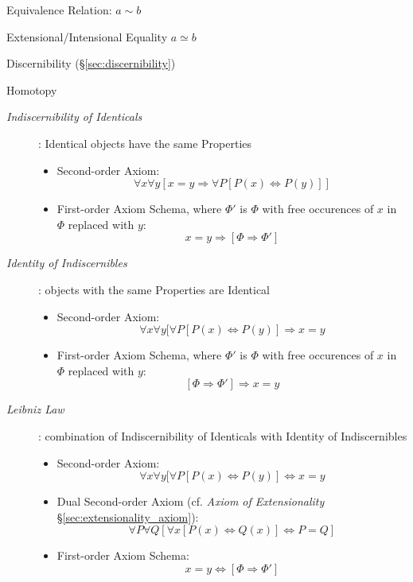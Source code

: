 Equivalence Relation: $a \sim b$

Extensional/Intensional Equality $a \simeq b$

Discernibility (\S\ref{sec:discernibility})

Homotopy



\begin{description}

\item[\emph{Indiscernibility of Identicals}]: Identical objects have
the same Properties
\begin{itemize}
    \item Second-order Axiom:
    \[
        \forall x \forall y
        [ x = y \Rightarrow \forall P [ P(x) \Leftrightarrow P(y) ]]
    \]
    \item First-order Axiom Schema, where $\Phi'$ is $\Phi$ with free
      occurences of $x$ in $\Phi$ replaced with $y$:
    \[
        x = y \Rightarrow [\Phi \Rightarrow \Phi']
    \]
\end{itemize}

\item[\emph{Identity of Indiscernibles}]: objects with the same Properties
are Identical
\begin{itemize}
    \item Second-order Axiom:
    \[
        \forall x \forall y
        [ \forall P [ P(x) \Leftrightarrow P(y) ] \Rightarrow x = y
    \]
    \item First-order Axiom Schema, where $\Phi'$ is $\Phi$ with free
      occurences of $x$ in $\Phi$ replaced with $y$:
    \[
        [\Phi \Rightarrow \Phi'] \Rightarrow x = y
    \]
\end{itemize}

\item[\emph{Leibniz Law}]: combination of Indiscernibility of
  Identicals with Identity of Indiscernibles
\begin{itemize}
    \item Second-order Axiom:
    \[
        \forall x \forall y
        [ \forall P [ P(x) \Leftrightarrow P(y) ] \Leftrightarrow x = y
    \]
    \item Dual Second-order Axiom (cf. \emph{Axiom of Extensionality}
      \S\ref{sec:extensionality_axiom}):
    \[
        \forall P \forall Q
        [ \forall x [P(x) \Leftrightarrow Q(x)] \Leftrightarrow P = Q ]
    \]
    \item First-order Axiom Schema:
    \[
        x = y \Leftrightarrow [\Phi \Rightarrow \Phi']
    \]
\end{itemize}


\end{description}



